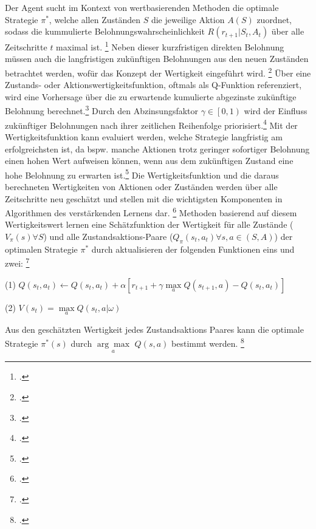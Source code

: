 Der Agent sucht im Kontext von wertbasierenden Methoden die optimale Strategie $\pi^{*}$, welche allen Zuständen $S$ die jeweilige Aktion $A(S)$ zuordnet, sodass die kummulierte Belohnungswahrscheinlichkeit $R(r_{t+1}|S_{t},A_{t})$ über alle Zeitschritte $t$ maximal ist. \footcite[Vgl.][S. 2]{Reda.2020}
Neben dieser kurzfristigen direkten Belohnung müssen auch die langfristigen zukünftigen Belohnungen aus den neuen Zuständen betrachtet werden, wofür das Konzept der Wertigkeit eingeführt wird. \footcite[Vgl.][S. 3]{Wang.2020}
Über eine Zustands- oder Aktionswertigkeitsfunktion, oftmals als Q-Funktion referenziert, wird eine Vorhersage über die zu erwartende kumulierte abgezinste zukünftige Belohnung berechnet.\footcite[Vgl.][S. 5]{Li.2019}
Durch den Abzinsungsfaktor $\gamma \in \left[0,1\right)$ wird der Einfluss zukünftiger Belohnungen nach ihrer zeitlichen Reihenfolge priorisiert.\footcite[Vgl][S. 5]{Li.2019}
Mit der Wertigkeitsfunktion kann evaluiert werden, welche Strategie langfristig am erfolgreichsten ist, da bspw. manche Aktionen trotz geringer sofortiger Belohnung einen hohen Wert aufweisen können, wenn aus dem zukünftigen Zustand eine hohe Belohnung zu erwarten ist.\footcite[Vgl.][S. 6]{Sutton.2018}
Die Wertigkeitsfunktion und die daraus berechneten Wertigkeiten von Aktionen oder Zuständen werden über alle Zeitschritte neu geschätzt und stellen mit die wichtigsten Komponenten in Algorithmen des verstärkenden Lernens dar. \footcite[Vgl.][S. 6f.]{Sutton.2018}
Methoden basierend auf diesem Wertigkeitswert lernen eine Schätzfunktion der Wertigkeit für alle Zustände ($V_{\pi}(s) \forall S$) und alle Zustandsaktions-Paare ($Q_{\pi}(s_{t},a_{t}) \forall s,a \in (S,A)$) der optimalen Strategie $\pi^{*}$ durch aktualisieren der folgenden Funktionen eins und zwei: \footcite[Vgl.][S. 2]{Zhang.2018} %
\begin{description}
    \item \begin{center} (1) $Q(s_{t}, a_{t}) \leftarrow Q(s_{t}, a_{t}) + \alpha\left[r_{t+1} + \gamma\max\limits_{a}Q(s_{t+1},a)-Q(s_{t},a_{t})\right]$ \end{center}
    \item \begin{center} (2) $V(s_{t}) = \max\limits_{a}Q(s_{t},a|\omega)$ \end{center}
\end{description}
Aus den geschätzten Wertigkeit jedes Zustandsaktions Paares kann die optimale Strategie $\pi^{*}(s)$ durch $\underset{a}{\arg\max}$ $Q(s,a)$ bestimmt werden. \footcite[Vgl.][S. 2]{Zhang.2018}


